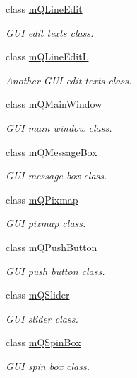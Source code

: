 \begin{DoxyCompactItemize}
class \hyperlink{classmolSimplify_1_1Classes_1_1mWidgets_1_1mQLineEdit}{m\+Q\+Line\+Edit}
\begin{DoxyCompactList}\small\item\em G\+UI edit texts class. \end{DoxyCompactList}\item 
class \hyperlink{classmolSimplify_1_1Classes_1_1mWidgets_1_1mQLineEditL}{m\+Q\+Line\+EditL}
\begin{DoxyCompactList}\small\item\em Another G\+UI edit texts class. \end{DoxyCompactList}\item 
class \hyperlink{classmolSimplify_1_1Classes_1_1mWidgets_1_1mQMainWindow}{m\+Q\+Main\+Window}
\begin{DoxyCompactList}\small\item\em G\+UI main window class. \end{DoxyCompactList}\item 
class \hyperlink{classmolSimplify_1_1Classes_1_1mWidgets_1_1mQMessageBox}{m\+Q\+Message\+Box}
\begin{DoxyCompactList}\small\item\em G\+UI message box class. \end{DoxyCompactList}\item 
class \hyperlink{classmolSimplify_1_1Classes_1_1mWidgets_1_1mQPixmap}{m\+Q\+Pixmap}
\begin{DoxyCompactList}\small\item\em G\+UI pixmap class. \end{DoxyCompactList}\item 
class \hyperlink{classmolSimplify_1_1Classes_1_1mWidgets_1_1mQPushButton}{m\+Q\+Push\+Button}
\begin{DoxyCompactList}\small\item\em G\+UI push button class. \end{DoxyCompactList}\item 
class \hyperlink{classmolSimplify_1_1Classes_1_1mWidgets_1_1mQSlider}{m\+Q\+Slider}
\begin{DoxyCompactList}\small\item\em G\+UI slider class. \end{DoxyCompactList}\item 
class \hyperlink{classmolSimplify_1_1Classes_1_1mWidgets_1_1mQSpinBox}{m\+Q\+Spin\+Box}
\begin{DoxyCompactList}\small\item\em G\+UI spin box class. \end{DoxyCompactList}\item 

\end{DoxyCompactItemize}
